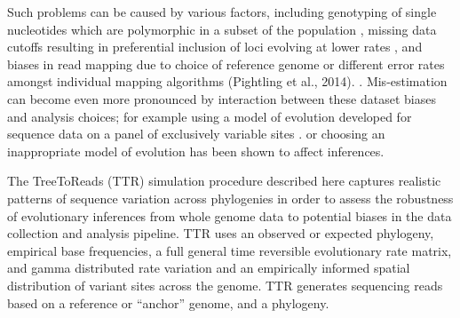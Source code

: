\documentclass[a4paper,10pt]{article}
\begin{document}
Such problems can be caused by various factors, 
including genotyping of single nucleotides which are polymorphic in a subset of the population \citep{mctavish_how_2015},
missing data cutoffs resulting in preferential inclusion of loci evolving at lower rates \citep{huang_unforeseen_2014},
and biases in read mapping due to choice of reference genome \citep{bertels_automated_2014} or different error rates amongst 
individual mapping algorithms (Pightling et al., 2014). .
Mis-estimation can become even more pronounced by interaction between these dataset biases and analysis choices;
for example using a model of evolution developed for sequence data 
on a panel of exclusively variable sites \citep{lewis_likelihood_2001}.
or choosing an inappropriate model of evolution \citep{sullivan_are_1997} has been shown to affect inferences.

The TreeToReads (TTR) simulation procedure described here captures realistic patterns of sequence variation across phylogenies in order to assess the robustness of evolutionary inferences from whole genome data to potential biases in the data collection and analysis pipeline.
TTR uses an observed or expected phylogeny, empirical base frequencies, a full general time reversible evolutionary rate matrix, and gamma distributed rate variation and an empirically informed spatial distribution of variant sites across the genome. 
TTR generates sequencing reads based on a reference or ``anchor'' genome, and a phylogeny.
\end{document}
